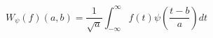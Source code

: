 \documentclass[10pt]{article}
\begin{document}
\begin{displaymath}
W_\psi (f) (a,b) = \frac{1}{\sqrt{a}} \int^\infty_{-\infty} f(t) \psi \left( \frac{t-b}{a} \right) dt
\end{displaymath}
\end{document}
